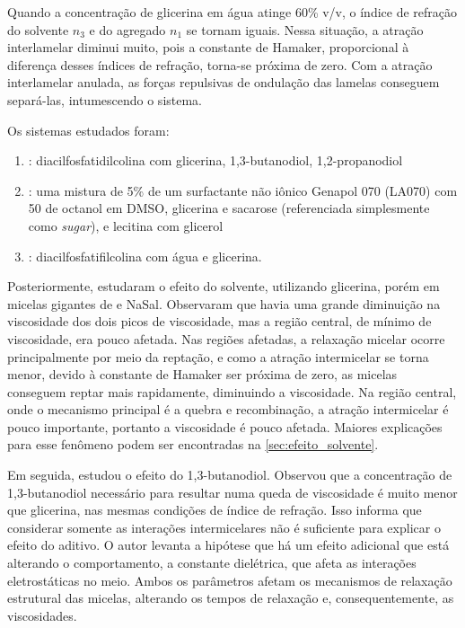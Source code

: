 		Quando a concentração de glicerina em água atinge 60\% v/v, o índice de refração do solvente \(n_3\) e do agregado \(n_1\) se tornam iguais. Nessa situação, a atração interlamelar diminui muito, pois a constante de Hamaker, proporcional à diferença desses índices de refração, torna-se próxima de zero. Com a atração interlamelar anulada, as forças repulsivas de ondulação das lamelas conseguem separá-las, intumescendo o sistema.
		
		Os sistemas estudados foram: 
		
		\begin{enumerate}[noitemsep]
			\item \citeauthor{Grabner2014}: diacilfosfatidilcolina com glicerina, 1,3-butanodiol, 1,2-propanodiol
			\item \citeauthor{Song2008a}: uma mistura de 5\% de um surfactante não iônico Genapol 070 (LA070) com 50\mM{} de octanol em DMSO, glicerina e sacarose (referenciada simplesmente como \emph{sugar}), e lecitina com glicerol
			\item \citeauthor{Shinto2012}: diacilfosfatifilcolina com água e glicerina.
		\end{enumerate}
		
		
		
		Posteriormente, \citeauthor{Hoffmann2010} estudaram o efeito do solvente, utilizando glicerina, porém em micelas gigantes de \CTAB{} e NaSal. Observaram que havia uma grande diminuição na viscosidade dos dois picos de viscosidade, mas a região central, de mínimo de viscosidade, era pouco afetada. Nas regiões afetadas, a relaxação micelar ocorre principalmente por meio da reptação, e como a atração intermicelar se torna menor, devido à constante de Hamaker ser próxima de zero, as micelas conseguem reptar mais rapidamente, diminuindo a viscosidade. Na região central, onde o mecanismo principal é a quebra e recombinação, a atração intermicelar é pouco importante, portanto a viscosidade é pouco afetada. Maiores explicações para esse fenômeno podem ser encontradas na \autoref{sec:efeito_solvente}. 
		
		Em seguida, \citeauthor{Abdel-Rahem2014} estudou o efeito do 1,3-butanodiol. Observou que a concentração de 1,3-butanodiol necessário para resultar numa queda de viscosidade é muito menor que glicerina, nas mesmas condições de índice de refração. Isso informa que considerar somente as interações intermicelares não é suficiente para explicar o efeito do aditivo. O autor levanta a hipótese que há um efeito adicional que está alterando o comportamento, a constante dielétrica, que afeta as interações eletrostáticas no meio. Ambos os parâmetros afetam os mecanismos de relaxação estrutural das micelas, alterando os tempos de relaxação e, consequentemente, as viscosidades. 
		

